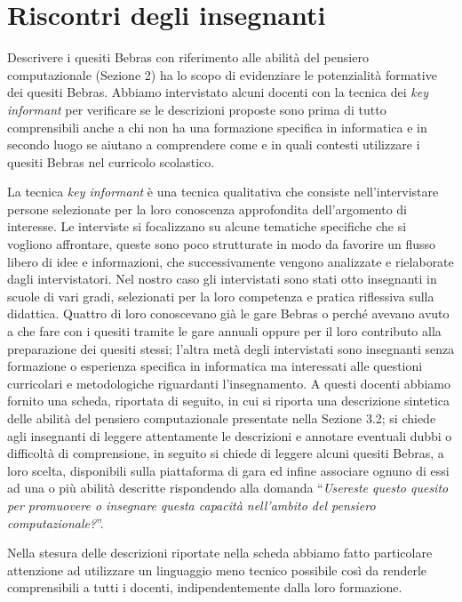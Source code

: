 \documentclass[12pt]{report}
\begin{document}
\begin{itemize}
\end{itemize}

\section{Riscontri degli insegnanti} \label{interviste}
Descrivere i quesiti Bebras con riferimento alle abilità del pensiero computazionale (Sezione 2) ha lo scopo di evidenziare le potenzialità formative dei quesiti Bebras.
Abbiamo intervistato alcuni docenti con la tecnica dei \textit{key informant} per verificare se le descrizioni proposte sono prima di tutto comprensibili anche a chi non ha una formazione specifica in informatica e in secondo luogo se aiutano a comprendere come e in quali contesti utilizzare i quesiti Bebras nel curricolo scolastico.


La tecnica \textit{key informant} è una tecnica qualitativa che consiste nell'intervistare persone selezionate per la loro conoscenza approfondita dell'argomento di interesse. Le interviste si focalizzano su alcune tematiche specifiche che si vogliono affrontare, queste sono poco strutturate in modo da favorire un flusso libero di idee e informazioni, che successivamente vengono analizzate e rielaborate dagli intervistatori.
Nel nostro caso gli intervistati sono stati otto insegnanti in scuole di vari gradi, selezionati per la loro competenza e pratica riflessiva sulla didattica. Quattro di loro conoscevano già le gare Bebras o perché avevano avuto a che fare con i quesiti tramite le gare annuali oppure per il loro contributo alla preparazione dei quesiti stessi; l'altra metà degli intervistati sono insegnanti senza formazione o esperienza specifica in informatica ma interessati alle questioni curricolari e metodologiche riguardanti l'insegnamento.
A questi docenti abbiamo fornito una scheda, riportata di seguito, in cui si riporta una descrizione sintetica delle abilità del pensiero computazionale presentate nella Sezione 3.2; si chiede agli insegnanti di leggere attentamente le descrizioni e annotare eventuali dubbi o difficoltà di comprensione, in seguito si chiede di leggere alcuni quesiti Bebras, a loro scelta, disponibili sulla piattaforma di gara ed infine associare ognuno di essi ad una o più abilità descritte rispondendo alla domanda ``\textit{Usereste questo quesito per promuovere o insegnare questa capacità nell'ambito del pensiero computazionale?}''.


Nella stesura delle descrizioni riportate nella scheda abbiamo fatto particolare attenzione ad utilizzare un linguaggio meno tecnico possibile così da renderle comprensibili a tutti i docenti, indipendentemente dalla loro formazione.
\end{document}
